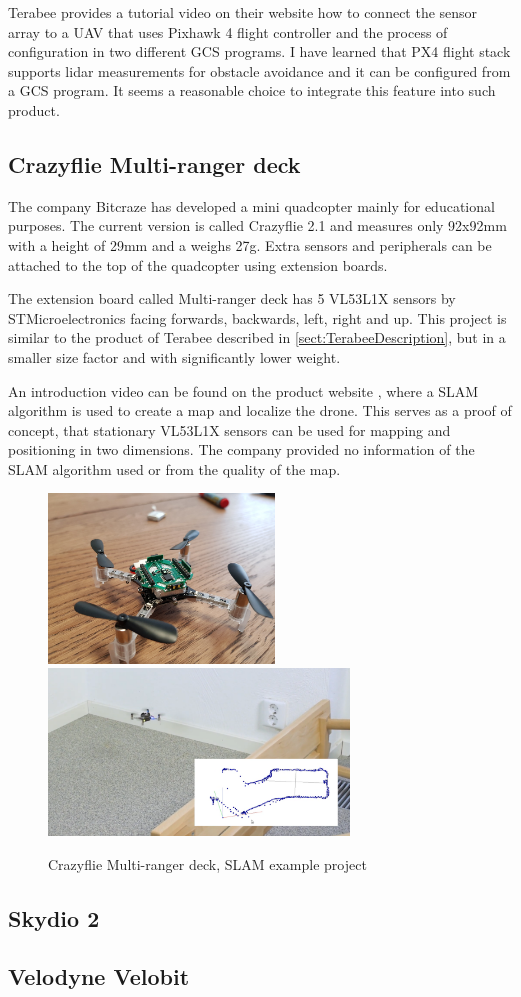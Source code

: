 Terabee provides a tutorial video on their website\cite{TerabeeTeraRanger} how to connect the 
sensor array to a UAV that uses Pixhawk 4 flight controller and the process of configuration 
in two different GCS programs. I have learned that PX4 flight stack supports lidar measurements
for obstacle avoidance and it can be configured from a GCS program. It seems a reasonable choice 
to integrate this feature into such product.

\subsection{Crazyflie Multi-ranger deck}
The company Bitcraze has developed a mini quadcopter mainly for educational purposes. The current version is
called Crazyflie 2.1 and measures only 92x92mm with a height of 29mm and a weighs 27g.
Extra sensors and peripherals can be attached to the top of the quadcopter using extension boards.

The extension board called Multi-ranger deck has 5 VL53L1X sensors by STMicroelectronics facing forwards, 
backwards, left, right and up. This project is similar to the product of Terabee described in \ref{sect:TerabeeDescription}, 
but in a smaller size factor and with significantly lower weight.

An introduction video can be found on the product website \cite{BitcrazeMultirangerDeck}, where 
a SLAM algorithm is used to create a map and localize the drone. This serves as a proof of concept,
that stationary VL53L1X sensors can be used for mapping and positioning in two dimensions. The company provided 
no information of the SLAM algorithm used or from the quality of the map.
\newpage
\begin{figure}[h]
    \centering
    \includegraphics[width=60mm, keepaspectratio]{figures/multiranger_deck.jpg}
    \includegraphics[width=80mm, keepaspectratio]{figures/multiranger_slam.png}
    \caption{Crazyflie Multi-ranger deck, SLAM example project}
    \label{fig:crazyflie_multiranger}
\end{figure}



\subsection{Skydio 2}
\subsection{Velodyne Velobit}
